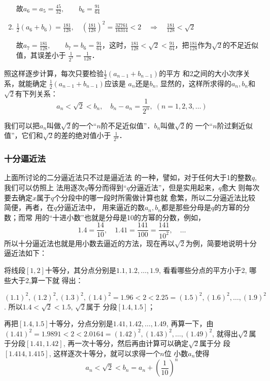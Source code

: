 \begin{enumerate}
     故$a_{6}=a_{5}=\frac{45}{32}, \qquad b_{6}=\frac{91}{64}
    $

    
    \item  $\frac{1}{2}\left(a_{6}+b_{6}\right)=\frac{181}{128},\quad \left(\frac{181}{128}\right)^{2}=\frac{32761}{16314}<2 \quad\Rightarrow\quad \frac{181}{128}<\sqrt{2}$
    
     故$a_{7}=\frac{181}{128}, \qquad b_{7}=b_{6}=\frac{91}{64}$，这时，$\frac{181}{128}<\sqrt{2}<\frac{91}{64}$，把$\frac{181}{128}$作为$\sqrt{2}$的不足近似值，其误差小于
$\frac{1}{2^7}=\frac{1}{128}$．
\end{enumerate}

照这样逐步计算，每次只要检验$\frac{1}{2}(a_{n-1}+b_{n-1})$的平方
和2之间的大小次序关系，就能确定
$\frac{1}{2}(a_{n-1}+b_{n-1})$应该是
$a_n$还是$b_n$, 显然的，这样所求得的$a_n,b_n$和$\sqrt{2}$有下列关系：
\[a_n<\sqrt{2}<b_n,\quad b_n-a_n=\frac{1}{2^n},\; (n=1,2,3,\ldots)\]

我们可以把$a_n$叫做$\sqrt{2}$的一个“$n$阶不足近似值”．$b_n$叫做$\sqrt{2}$的
一个“$n$阶过剩近似值”，它们和$\sqrt{2}$的差的绝对值小于
$\frac{1}{2^n}$．


\subsubsection{十分逼近法}

上面所讨论的二分逼近法只不过是逼近法
的一种，譬如，对于任何大于1的整数$q$, 我们可以仿照上
法用逐次$q$等分而得到“$q$分逼近法”，但是实用起来，$q$愈大
则每次要去确定$x$属于$q$个分段中的哪一段时所需做计算也就
愈繁，所以二分逼近法比较简便，再者，在$q$分逼近法中，
用来逼近的数$a_n,b_n$都是那些分母是$q$的方幂的分数；而常
用的“十进小数”也就是分母是10的方幂的分数，例如，
\[1.4=\frac{14}{10},\quad  1.41=\frac{141}{100}=\frac{141}{10^2},\quad \ldots \]
所以十分逼近法也就是用小数去逼近的方法，现在再以$\sqrt{2}$为例，简要地说明十分逼近法如下：

将线段$[1,2]$十等分，其分点分别是$1.1,1.2,\ldots,
1.9$, 看看哪些分点的平方小于2, 哪些大于2,算一下就
得出：

$(1.1)^2,(1.2)^2,(1.3)^2,(1.4)^2=1.96<2<2.25=
(1.5)^2,(1.6)^2,\ldots ,(1.9)^2$. 所以$1.4<\sqrt{2}<1.5$, $\sqrt{2}$属于
分段$[1.4,1.5]$；

再把$[1.4,1.5]$十等分，分点分别是$1.41,1.42,\ldots,
1.49$, 再算一下，由$(1.41)^2=1.9891<2<2.0164=
(1.42)^2,(1.43)^2,\ldots,(1.49)^2$, 就得出$\sqrt{2}$属于分段$[1.41,1.42]$, 再一次十等分，然后再由计算可以确定$\sqrt{2}$属于分
段$[1.414,1.415]$, 这样逐次十等分，就可以求得一个$n$位
小数$a_n$使得
\[a_n<\sqrt{2}<b_n=a_n+\left(\frac{1}{10}\right)^n\]

